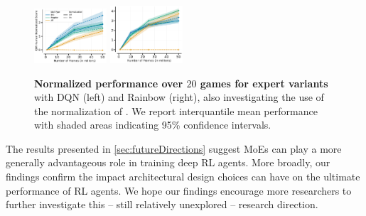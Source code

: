 \documentclass{article}
\theoremstyle{plain}
\theoremstyle{definition}
\theoremstyle{remark}
\begin{document}
\ifarxiv
\else
    \begin{figure}[!t]
        \centering
        \includegraphics[width=0.241\textwidth]{figures/MOEsBig_johanDQN.pdf}%
        \includegraphics[width=0.241\textwidth]{figures/MOEsBig_johan_Rainbow.pdf}%
        
        \caption{\textbf{Normalized performance over $20$ games for expert variants} with DQN (left) and Rainbow (right), also investigating the use of the normalization of \citet{puigcerver2023sparse}. We report interquantile mean performance with shaded areas indicating 95\% confidence intervals.}
        \label{fig:dqn_bigmoe_iqm}
    \end{figure}
\fi

The results presented in \cref{sec:futureDirections} suggest MoEs can play a more generally advantageous role in training deep RL agents. More broadly, our findings confirm the impact architectural design choices can have on the ultimate performance of RL agents. We hope our findings encourage more researchers to further investigate this -- still relatively unexplored -- research direction.

\ifarxiv
    
\else
    
    
\fi



\ifarxiv
\else
    
\fi


\newpage
\appendix
\onecolumn


\end{document}
